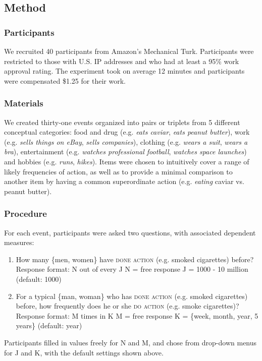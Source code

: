\documentclass[10pt,letterpaper]{article}
\newcommand{\ndg}[1]{\textcolor{Green}{[ndg: #1]}}
\begin{document}
\subsection{Method}

\subsubsection{Participants}
We recruited 40 participants from Amazon's Mechanical Turk.
Participants were restricted to those with U.S. IP addresses and who had at least a 95\% work approval rating.
The experiment took on average 12 minutes and participants were compensated \$1.25 for their work.

\subsubsection{Materials}

We created thirty-one events organized into pairs or triplets from 5 different conceptual categories: food and drug (e.g. \emph{eats caviar}, \emph{eats peanut butter}), work (e.g. \emph{sells things on eBay}, \emph{sells companies}), clothing (e.g. \emph{wears a suit}, \emph{wears a bra}), entertainment (e.g. \emph{watches professional football}, \emph{watches space launches}) and hobbies (e.g. \emph{runs}, \emph{hikes}). 
Items were chosen to intuitively cover a range of likely frequencies of action, as well as to provide a minimal comparison to another item by having a common superordinate action (e.g. \emph{eating} caviar vs. peanut butter).

\subsubsection{Procedure}

For each event, participants were asked two questions, with associated dependent measures:
\begin{enumerate}
\item How many \{men, women\} have \textsc{done action} (e.g. smoked cigarettes) before?
\subitem Response format: N out of every J
\subitem N = free response
\subitem J = 1000 - 10 million (default: 1000)
\item For a typical \{man, woman\} who has \textsc{done action}  (e.g. smoked cigarettes) before, how frequently does he or she \textsc{do action} (e.g. smoke cigarettes)?
\subitem Response format: M times in K
\subitem M = free response
\subitem K = \{week, month, year, 5 years\} (default: year)
\end{enumerate}
Participants filled in values freely for N and M, and chose from drop-down menus for J and K, with the default settings shown above. 
\end{document}
